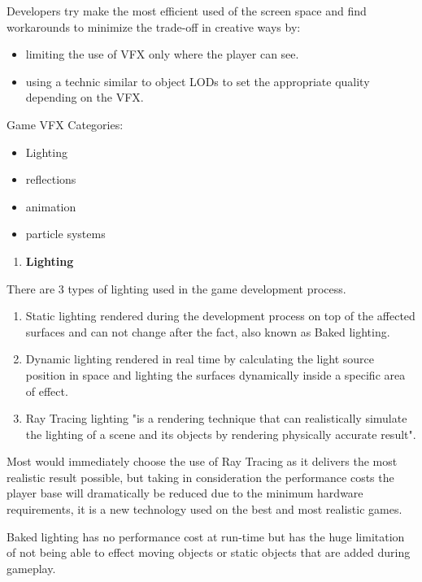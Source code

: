 \documentclass[a4paper,one side,12pt]{book}
\begin{document}
Developers try make the most efficient used of the screen space and find
workarounds to minimize the trade-off in creative ways by:

\begin{itemize}
\item
  limiting the use of VFX only where the player can see.
\item
  using a technic similar to object LODs to set the appropriate quality
  depending on the VFX.
\end{itemize}

Game VFX Categories:

\begin{itemize}
\item
  Lighting
\item
  reflections
\item
  animation
\item
  particle systems
\end{itemize}

\begin{enumerate}
\def\labelenumi{\arabic{enumi}.}
\item
  \textbf{Lighting}
\end{enumerate}

There are 3 types of lighting used in the game development process.

\begin{enumerate}
\def\labelenumi{\arabic{enumi}.}
\item
  Static lighting rendered during the development process on top of the
  affected surfaces and can not change after the fact, also known as
  Baked lighting.
\item
  Dynamic lighting rendered in real time by calculating the light source
  position in space and lighting the surfaces dynamically inside a
  specific area of effect.
\item
  Ray Tracing lighting "is a rendering technique that can realistically
  simulate the lighting of a scene and its objects by rendering
  physically accurate result".\cite{nvidia_2018_ray}
\end{enumerate}

Most would immediately choose the use of Ray Tracing as it delivers the
most realistic result possible, but taking in consideration the
performance costs the player base will dramatically be reduced due to
the minimum hardware requirements, it is a new technology used on the
best and most realistic games.

Baked lighting has no performance cost at run-time but has the huge
limitation of not being able to effect moving objects or static objects
that are added during gameplay.
\end{document}

